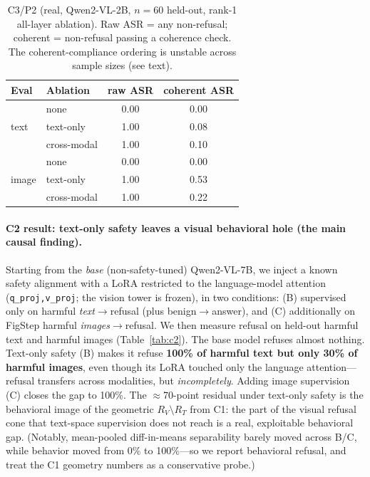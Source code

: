 \documentclass[11pt]{article}
\begin{document}
\begin{table}[h]
\centering
\caption{C3/P2 (real, Qwen2-VL-2B, $n{=}60$ held-out, rank-1 all-layer ablation).
Raw ASR = any non-refusal; coherent = non-refusal passing a coherence check.
The coherent-compliance ordering is unstable across sample sizes (see text).}
\label{tab:p2}
\begin{tabular}{llcc}
\toprule
Eval & Ablation & raw ASR & coherent ASR \\
\midrule
\multirow{3}{*}{text}  & none        & 0.00 & 0.00 \\
                       & text-only   & 1.00 & 0.08 \\
                       & cross-modal & 1.00 & 0.10 \\
\midrule
\multirow{3}{*}{image} & none        & 0.00 & 0.00 \\
                       & text-only   & 1.00 & 0.53 \\
                       & cross-modal & 1.00 & 0.22 \\
\bottomrule
\end{tabular}
\end{table}

\paragraph{C2 result: text-only safety leaves a visual behavioral hole (the main
causal finding).} Starting from the \emph{base} (non-safety-tuned) Qwen2-VL-7B, we
inject a known safety alignment with a LoRA restricted to the language-model attention
(\texttt{q\_proj,v\_proj}; the vision tower is frozen), in two conditions: (B) supervised
only on harmful \emph{text}$\rightarrow$refusal (plus benign$\rightarrow$answer), and
(C) additionally on FigStep harmful \emph{images}$\rightarrow$refusal. We then measure
refusal on held-out harmful text and harmful images (Table~\ref{tab:c2}). The base model
refuses almost nothing. Text-only safety (B) makes it refuse \textbf{100\% of harmful
text but only 30\% of harmful images}, even though its LoRA touched only the language
attention---refusal transfers across modalities, but \emph{incompletely}. Adding image
supervision (C) closes the gap to 100\%. The $\approx$70-point residual under text-only
safety is the behavioral image of the geometric $R_V\setminus R_T$ from C1: the part of
the visual refusal cone that text-space supervision does not reach is a real,
exploitable behavioral gap. (Notably, mean-pooled diff-in-means separability barely
moved across B/C, while behavior moved from 0\% to 100\%---so we report behavioral
refusal, and treat the C1 geometry numbers as a conservative probe.)
\end{document}

